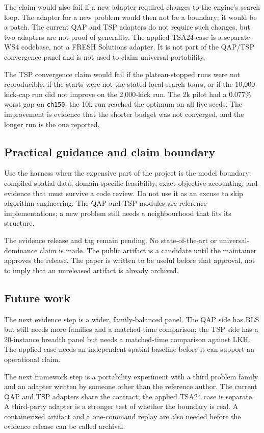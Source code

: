 \documentclass[pdflatex,sn-mathphys-num]{sn-jnl}
\begin{document}
The claim would also fail if a new adapter required changes to the engine's search loop. The adapter
for a new problem would then not be a boundary; it would be a patch. The current QAP and TSP adapters
do not require such changes, but two adapters are not proof of generality. The applied TSA24 case is a separate WS4 codebase, not a FRESH Solutions adapter. It is not part of
the QAP/TSP convergence panel and is not used to claim universal portability.

The TSP convergence claim would fail if the plateau-stopped runs were not reproducible, if the starts
were not the stated local-search tours, or if the 10,000-kick-cap run did not improve on the
2,000-kick run.
The 2k pilot had a 0.077\% worst gap on \texttt{ch150}; the 10k run reached the optimum on all five
seeds. The improvement is evidence that the shorter budget was not converged, and the longer run is
the one reported.

\subsection{Practical guidance and claim boundary}

Use the harness when the expensive part of the project is the model boundary: compiled spatial data,
domain-specific feasibility, exact objective accounting, and evidence that must survive a code review.
Do not use it as an excuse to skip algorithm engineering. The QAP and TSP modules are reference
implementations; a new problem still needs a neighbourhood that fits its structure.

The evidence release and tag remain pending. No state-of-the-art or universal-dominance claim is made.
The public artifact is a candidate until the maintainer approves the release. The paper is written to
be useful before that approval, not to imply that an unreleased artifact is already archived.

\subsection{Future work}

The next evidence step is a wider, family-balanced panel. The QAP side has BLS but still needs more
families and a matched-time comparison; the TSP side has a 20-instance breadth panel but needs a
matched-time comparison against LKH. The applied case needs an independent spatial baseline before
it can support an operational claim.

The next framework step is a portability experiment with a third problem family and an adapter
written by someone other than the reference author. The current QAP and TSP adapters share the contract; the applied TSA24 case is separate. A
third-party adapter is a stronger test of whether the boundary is real. A
containerized artifact and a one-command replay are also needed before the evidence release can be
called archival.
\end{document}
